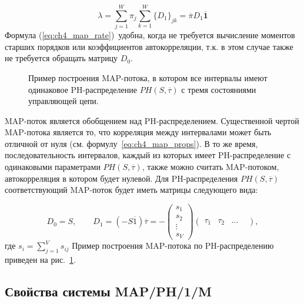 \begin{equation}
	\label{eq:ch4_map_rate}
	\lambda = \sum\limits_{j=1}^{W} \pi_j \sum\limits_{k=1}^{W} \{D_1\}_{jk} = \overline{\pi} D_1 \overline{\mathbf{1}}
\end{equation}
Формула (\ref{eq:ch4_map_rate})~удобна, когда не требуется вычисление моментов старших порядков или коэффициентов автокорреляции, т.к. в этом случае также не требуется обращать матрицу $D_0$.

\begin{figure}[h]
    \caption{Пример построения MAP-потока, в котором все интервалы имеют одинаковое PH-распределение $PH(S, \overline{\tau})$ с тремя состояниями управляющей цепи.
    \label{fig:ch4_ph2map}}
\end{figure}

MAP-поток является обобщением над PH-распределением. Существенной чертой MAP-потока является то, что корреляция между интервалами может быть отличной от нуля (см. формулу~\eqref{eq:ch4_map_props}). В то же время, последовательность интервалов, каждый из которых имеет PH-распределение с одинаковыми параметрами $PH(S, \overline{\tau})$, также можно считать MAP-потоком, автокорреляция в котором будет нулевой. Для PH-распределения $PH(S, \overline{\tau})$ соответствующий MAP-поток будет иметь матрицы следующего вида:

\begin{equation}
    \label{eq:ch4_map-ph_representation}
    D_0 = S, \qquad D_1 = (-S \overline{1}) \overline{\tau} = -\left(
        \begin{matrix}
            s_1\\
            s_2\\
            \vdots\\
            s_V
        \end{matrix}
     \right) \left(
         \begin{matrix}
            \tau_1 & \tau_2 & \dots &
         \end{matrix}
     \right),
\end{equation}
где $s_i = \sum_{j=1}^V s_{ij}$
Пример построения MAP-потока по PH-распределению приведен на рис.~\ref{fig:ch4_ph2map}.



\subsection{Свойства системы MAP/PH/1/M}\label{sec:ch4_queue_net_system_props}

